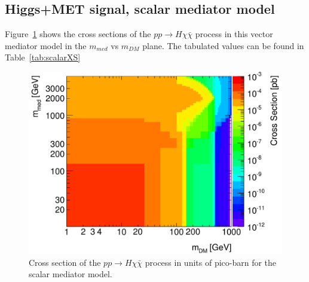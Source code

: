 \subsection{Higgs+MET signal, scalar mediator model}

Figure~\ref{fig:scalarXS} shows the cross sections of the $pp \rightarrow H\chi\bar{\chi}$ process 
in this vector mediator model in the $m_{med}$ 
vs $m_{DM}$ plane. The tabulated values can be found in Table~\ref{tab:scalarXS}

\begin{figure}[hbpt!]
	\includegraphics[width=0.8\linewidth]{figures/EW/monoH/scalar_cross_section_new}
	\caption{ \label{fig:scalarXS} Cross section of the $pp \rightarrow H\chi\bar{\chi}$ process 
		in units of pico-barn for the scalar mediator model.}
\end{figure}


